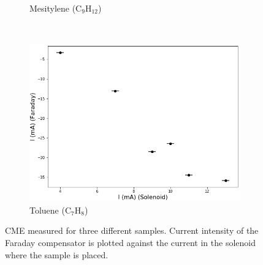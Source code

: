 \documentclass[11pt,a4paper]{article}
\begin{document}
\begin{appendices}
\begin{figure}[H]
\begin{subfigure}[b]{0.55\textwidth}
\caption{Mesitylene (C$_9$H$_{12}$)}
\label{fig:CME_sample2}
\end{subfigure}\\\vspace{.2cm}
\begin{subfigure}[b]{0.55\textwidth}
\includegraphics[width=\textwidth]{sample1}
\caption{Toluene (C$_7$H$_8$)}
\label{fig:CME_sample1}
\end{subfigure}
\caption{CME measured for three different samples. Current intensity of the Faraday compensator is plotted against the current in the solenoid where the sample is placed.}
\label{fig:CME}
\end{figure}

\end{appendices}
\end{document}
